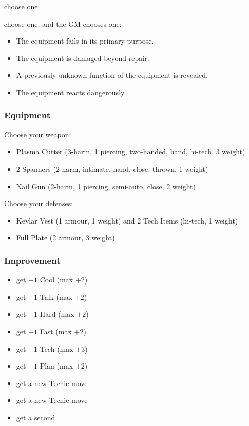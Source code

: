 {choose one:}
{choose one, and the GM chooses one:
\begin{itemize}
\item The equipment fails in its primary purpose.
\item The equipment is damaged beyond repair.
\item A previously-unknown function of the equipment is revealed.
\item The equipment reacts dangerously.
\end{itemize}}

\subsubsection{Equipment}
Choose your weapon:
\begin{itemize}
\item Plasma Cutter (3-harm, 1 piercing, two-handed, hand, hi-tech, 3 weight)
\item 2 Spanners (2-harm, intimate, hand, close, thrown, 1 weight)
\item Nail Gun (2-harm, 1 piercing, semi-auto, close, 2 weight)
\end{itemize}

Choose your defenses:
\begin{itemize}
\item Kevlar Vest (1 armour, 1 weight) and 2 Tech Items (hi-tech, 1 weight)
\item Full Plate (2 armour, 3 weight)
\end{itemize}

\subsubsection{Improvement}
\begin{itemize}
\item get $+1$ Cool (max $+2$)
\item get $+1$ Talk (max $+2$)
\item get $+1$ Hard (max $+2$)
\item get $+1$ Fast (max $+2$)
\item get $+1$ Tech (max $+3$)
\item get $+1$ Plan (max $+2$)
\item get a new Techie move
\item get a new Techie move
\item get a second 
\end{itemize}